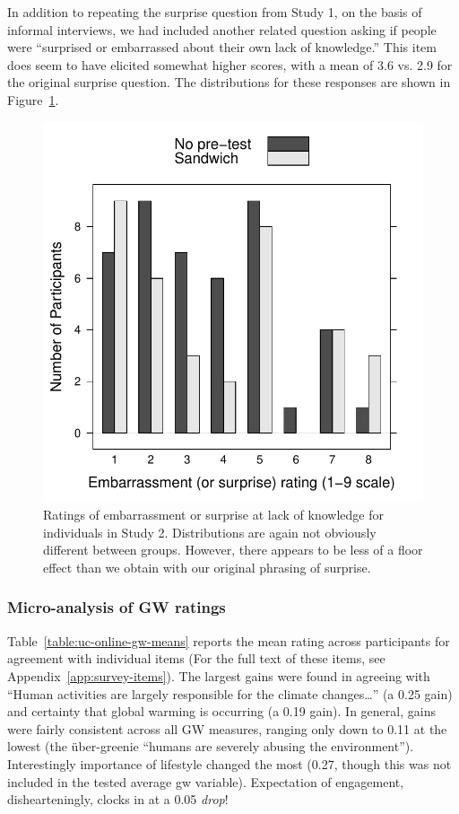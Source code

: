 In addition to repeating the surprise question from Study 1, on the basis of
informal interviews, we had included another related question asking if people
were “surprised or embarrassed about their own lack of knowledge.” This item
does seem to have elicited somewhat higher scores, with a mean of 3.6 vs. 2.9
for the original surprise question. The distributions for these responses are
shown in Figure~\ref{fig:rpp-mech-embarrass}.

\begin{figure}
    \centering
    \includegraphics{RPP-mech-embarrass-by-group.pdf}
    \caption{Ratings of embarrassment or surprise at lack of knowledge for
        individuals in Study 2. Distributions are again not obviously different
        between groups. However, there appears to be less of a floor effect than
        we obtain with our original phrasing of surprise.}
    \label{fig:rpp-mech-embarrass}
\end{figure}

\subsubsection{Micro-analysis of GW ratings}

Table~\ref{table:uc-online-gw-means} reports the mean rating across participants
for agreement with individual items (For the full text of these items, see
Appendix~\ref{app:survey-items}). The largest gains were found in agreeing with
``Human activities are largely responsible for the climate changes\ldots'' (a
0.25 gain) and certainty that global warming is occurring (a 0.19 gain).  In
general, gains were fairly consistent across all GW measures, ranging only
down to 0.11 at the lowest (the über-greenie “humans are severely abusing the
environment”). Interestingly importance of lifestyle changed the most
(0.27, though this was not included in the tested average gw variable).
Expectation of engagement, dishearteningly, clocks in at a 0.05 \emph{drop}! 

